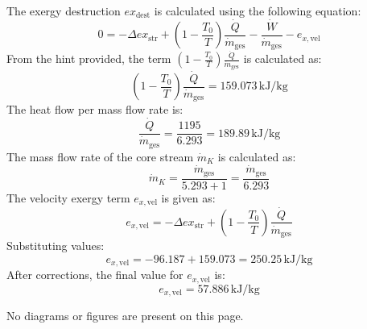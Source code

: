 The exergy destruction \( ex_{\text{dest}} \) is calculated using the following equation:  
\[
0 = -\Delta ex_{\text{str}} + \left(1 - \frac{T_0}{T}\right) \frac{\dot{Q}}{\dot{m}_{\text{ges}}} - \frac{\dot{W}}{\dot{m}_{\text{ges}}} - e_{x,\text{vel}}
\]  
From the hint provided, the term \( \left(1 - \frac{T_0}{T}\right) \frac{\dot{Q}}{\dot{m}_{\text{ges}}} \) is calculated as:  
\[
\left(1 - \frac{T_0}{T}\right) \frac{\dot{Q}}{\dot{m}_{\text{ges}}} = 159.073 \, \text{kJ/kg}
\]  
The heat flow per mass flow rate is:  
\[
\frac{\dot{Q}}{\dot{m}_{\text{ges}}} = \frac{1195}{6.293} = 189.89 \, \text{kJ/kg}
\]  
The mass flow rate of the core stream \( \dot{m}_K \) is calculated as:  
\[
\dot{m}_K = \frac{\dot{m}_{\text{ges}}}{5.293 + 1} = \frac{\dot{m}_{\text{ges}}}{6.293}
\]  
The velocity exergy term \( e_{x,\text{vel}} \) is given as:  
\[
e_{x,\text{vel}} = -\Delta ex_{\text{str}} + \left(1 - \frac{T_0}{T}\right) \frac{\dot{Q}}{\dot{m}_{\text{ges}}}
\]  
Substituting values:  
\[
e_{x,\text{vel}} = -96.187 + 159.073 = 250.25 \, \text{kJ/kg}
\]  
After corrections, the final value for \( e_{x,\text{vel}} \) is:  
\[
e_{x,\text{vel}} = 57.886 \, \text{kJ/kg}
\]  

No diagrams or figures are present on this page.